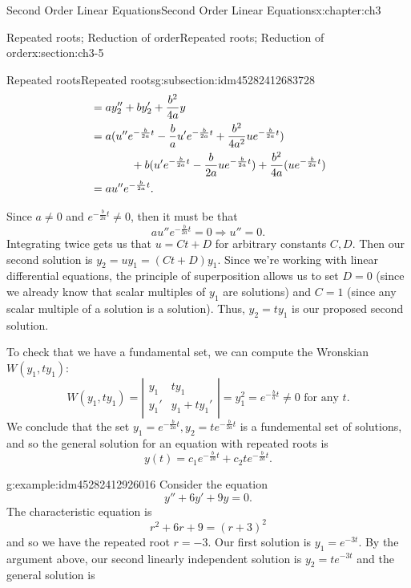 \documentclass[oneside,10pt,]{book}
\numberwithin{equation}{section}
\numberwithin{equation}{section}
\newcommand{\amp}{&}
\begin{document}
\begin{chapterptx}{Second Order Linear Equations}{}{Second Order Linear Equations}{}{}{x:chapter:ch3}
\begin{sectionptx}{Repeated roots; Reduction of order}{}{Repeated roots; Reduction of order}{}{}{x:section:ch3-5}
\begin{subsectionptx}{Repeated roots}{}{Repeated roots}{}{}{g:subsection:idm45282412683728}
\begin{align*}
\amp= ay_2'' + by_2' + \frac{b^2}{4a}y\\
\amp= a(u'' e^{-\frac{b}{2a} t} - \frac{b}{a} u' e^{-\frac{b}{2a}t} + \frac{b^2}{4a^2} u e^{-\frac{b}{2a}t})\\
\amp\hspace{.5in} + b(u' e^{-\frac{b}{2a}t} -\frac{b}{2a} u e^{-\frac{b}{2a}t}) + \frac{b^2}{4a}(u e^{-\frac{b}{2a}t})\\
\amp = a u'' e^{-\frac{b}{2a}t}.
\end{align*}
%
\par
Since \(a \neq 0\) and \(e^{-\frac{b}{2a}t} \neq 0\), then it must be that%
\begin{equation*}
a u'' e^{-\frac{b}{2a} t} = 0 \Rightarrow u'' = 0.
\end{equation*}
Integrating twice gets us that \(u = Ct + D\) for arbitrary constants \(C, D\). Then our second solution is \(y_2 = u y_1 = (Ct + D)y_1\). Since we're working with linear differential equations, the principle of superposition allows us to set \(D = 0\) (since we already know that scalar multiples of \(y_1\) are solutions) and \(C = 1\) (since any scalar multiple of a solution is a solution). Thus, \(y_2 = t y_1\) is our proposed second solution.%
\par
To check that we have a fundamental set, we can compute the Wronskian \(W(y_1, t y_1)\):%
\begin{equation*}
W(y_1, t y_1) = \left| \begin{array}{cc} y_1 \amp t y_1 \\
y_1' \amp y_1 + t y_1' \end{array}\right| = y_1^2 = e^{-\frac{b}{a}t} \neq 0 \text{ for any } t.
\end{equation*}
We conclude that the set \(y_1 = e^{-\frac{b}{2a}t}, y_2 = t e^{-\frac{b}{2a}t}\) is a fundemental set of solutions, and so the general solution for an equation with repeated roots is%
\begin{equation*}
y(t) = c_1 e^{-\frac{b}{2a}t} + c_2t e^{-\frac{b}{2a}t}.
\end{equation*}
%
\begin{example}{}{g:example:idm45282412926016}%
Consider the equation%
\begin{equation*}
y'' + 6y' + 9y = 0.
\end{equation*}
The characteristic equation is%
\begin{equation*}
r^2 + 6r + 9 = (r + 3)^2
\end{equation*}
and so we have the repeated root \(r = -3\). Our first solution is \(y_1 = e^{-3t}\). By the argument above, our second linearly independent solution is \(y_2 = t e^{-3t}\) and the general solution is%

\end{example}
\end{subsectionptx}
\end{sectionptx}
\end{chapterptx}
\end{document}
